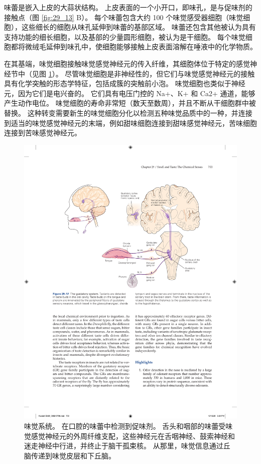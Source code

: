味蕾是嵌入上皮的大蒜状结构。 上皮表面的一个小开口，即味孔，是与促味剂的接触点（图 \ref{fig:29_13} B）。 每个味蕾包含大约 100 个味觉感受器细胞（味觉细胞），这些细长的细胞从味孔延伸到味蕾的基部区域。 味蕾还包含其他被认为具有支持功能的细长细胞，以及基部的少量圆形细胞，被认为是干细胞。 每个味觉细胞都将微绒毛延伸到味孔中，使细胞能够接触上皮表面溶解在唾液中的化学物质。

在其基端，味觉细胞接触味觉感觉神经元的传入纤维，其细胞体位于特定的感觉神经节中（见图 \ref{fig:29_17}）。 
尽管味觉细胞是非神经性的，但它们与味觉感觉神经元的接触具有化学突触的形态学特征，包括成簇的突触前小泡。 味觉细胞也类似于神经元，因为它们是电兴奋的。 它们具有电压门控的 Na+、K+ 和 Ca2+ 通道，能够产生动作电位。 味觉细胞的寿命非常短（数天至数周），并且不断从干细胞群中被替换。 这种转变需要新生的味觉细胞分化以检测五种味觉品质中的一种，并连接到适当的味觉感觉神经元的末端，例如甜味细胞连接到甜味感觉神经元，苦味细胞连接到苦味感觉神经元。

\begin{figure}[htbp]
	\centering
	\includegraphics[width=0.75\linewidth]{chap29/fig_29_17}
	\caption{味觉系统。 在口腔的味蕾中检测到促味剂。 舌头和咽部的味蕾受味觉感觉神经元的外周纤维支配，这些神经元在舌咽神经、鼓索神经和迷走神经中行进，并终止于脑干孤束核。 从那里，味觉信息通过丘脑传递到味觉皮层和下丘脑。}
	\label{fig:29_17}
\end{figure}

